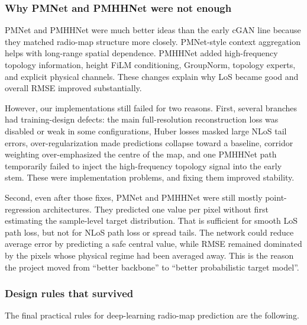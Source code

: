 \subsubsection{Why PMNet and PMHHNet were not enough}

PMNet and PMHHNet were much better ideas than the early cGAN line because they
matched radio-map structure more closely. PMNet-style context aggregation
helps with long-range spatial dependence. PMHHNet added high-frequency
topology information, height FiLM conditioning, GroupNorm, topology experts,
and explicit physical channels. These changes explain why LoS became good and
overall RMSE improved substantially.

However, our implementations still failed for two reasons. First, several
branches had training-design defects: the main full-resolution reconstruction
loss was disabled or weak in some configurations, Huber losses masked large NLoS tail
errors, over-regularization made predictions collapse toward a baseline,
corridor weighting over-emphasized the centre of the map, and one PMHHNet path
temporarily failed to inject the high-frequency topology signal into the early
stem. These were implementation problems, and fixing them improved stability.

Second, even after those fixes, PMNet and PMHHNet were still mostly
point-regression architectures. They predicted one value per pixel without
first estimating the sample-level target distribution. That is sufficient for
smooth LoS path loss, but not for NLoS path loss or spread tails. The network
could reduce average error by predicting a safe central value, while RMSE
remained dominated by the pixels whose physical regime had been averaged
away. This is the reason the project moved from ``better backbone'' to
``better probabilistic target model''.

\subsubsection{Design rules that survived}

The final practical rules for deep-learning radio-map prediction are the
following.


